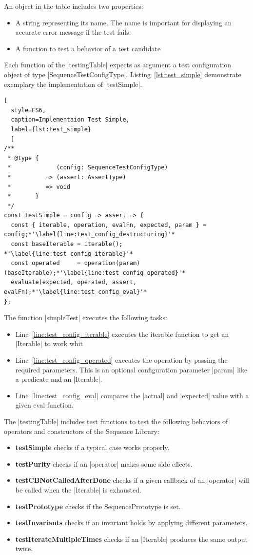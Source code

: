 An object in the table includes two properties:
\begin{itemize}
\item{A string representing its name. The name is important for displaying an accurate error message if the test fails.}
\item{A function to test a behavior of a test candidate}
\end{itemize}

Each function of the |testingTable| expects as argument a test configuration
object of type |SequenceTestConfigType|.
Listing~\ref{lst:test_simple} demonstrate exemplary the
implementation of |testSimple|.

\begin{lstlisting}[
  style=ES6, 
  caption=Implementaion Test Simple,
  label={lst:test_simple}
  ]
/**
 * @type {
 *             (config: SequenceTestConfigType)
 *          => (assert: AssertType)
 *          => void
 *       }
 */
const testSimple = config => assert => {
  const { iterable, operation, evalFn, expected, param } = config;*'\label{line:test_config_destructuring}'*
  const baseIterable = iterable(); *'\label{line:test_config_iterable}'*
  const operated     = operation(param)(baseIterable);*'\label{line:test_config_operated}'*
  evaluate(expected, operated, assert, evalFn);*'\label{line:test_config_eval}'*
};
\end{lstlisting}

The function |simpleTest| executes the following tasks:
\begin{itemize}
  \item{Line~\ref{line:test_config_iterable} executes the iterable function to get an |Iterable| to work whit}
  \item{Line~\ref{line:test_config_operated} executes the operation by passing
    the required parameters. This is an optional configuration parameter |param| like a predicate and an |Iterable|.}
  \item{Line~\ref{line:test_config_eval} compares the |actual| and |expected| value with a given eval function. } 
\end{itemize}

The |testingTable| includes test functions to test the following behaviors of
operators and constructors of the Sequence Library:

\begin{itemize}
  \item{\textbf{testSimple} checks if a typical case works properly.}
  \item{\textbf{testPurity} checks if an |operator| makes some side effects.}
  \item{\textbf{testCBNotCalledAfterDone} checks if a given callback of an
    |operator| will be called when the |Iterable| is exhausted.}
  \item{\textbf{testPrototype} checks if the SequencePrototype is set.}
  \item{\textbf{testInvariants} checks if an invariant holds by applying different parameters.}
  \item{\textbf{testIterateMultipleTimes} checks if an |Iterable| produces the same output twice.}
\end{itemize}


